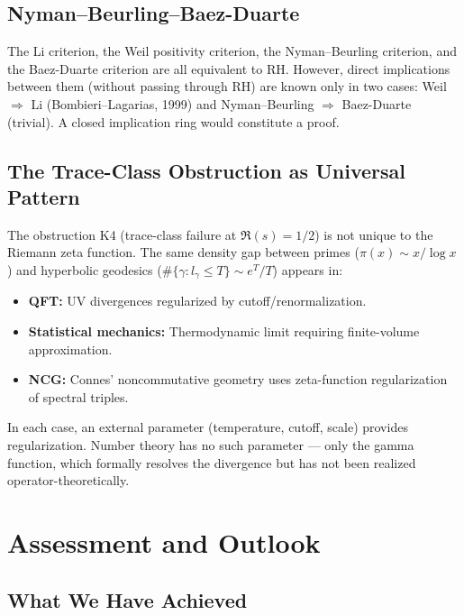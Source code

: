 \documentclass[12pt,a4paper]{article}
\theoremstyle{definition}
\theoremstyle{remark}
\begin{document}
\subsection{Nyman--Beurling--Baez-Duarte}

The Li criterion, the Weil positivity criterion, the Nyman--Beurling criterion, and the Baez-Duarte criterion are all equivalent to RH. However, direct implications between them (without passing through RH) are known only in two cases: Weil $\Rightarrow$ Li (Bombieri--Lagarias, 1999) and Nyman--Beurling $\Rightarrow$ Baez-Duarte (trivial). A closed implication ring would constitute a proof.

\subsection{The Trace-Class Obstruction as Universal Pattern}

The obstruction K4 (trace-class failure at $\Re(s) = 1/2$) is not unique to the Riemann zeta function. The same density gap between primes ($\pi(x) \sim x/\log x$) and hyperbolic geodesics ($\#\{\gamma: l_\gamma \leq T\} \sim e^T/T$) appears in:
\begin{itemize}
  \item \textbf{QFT:} UV divergences regularized by cutoff/renormalization.
  \item \textbf{Statistical mechanics:} Thermodynamic limit requiring finite-volume approximation.
  \item \textbf{NCG:} Connes' noncommutative geometry uses zeta-function regularization of spectral triples.
\end{itemize}
In each case, an external parameter (temperature, cutoff, scale) provides regularization. Number theory has no such parameter --- only the gamma function, which formally resolves the divergence but has not been realized operator-theoretically.


\section{Assessment and Outlook}
\label{sec:outlook}

\subsection{What We Have Achieved}
\end{document}
